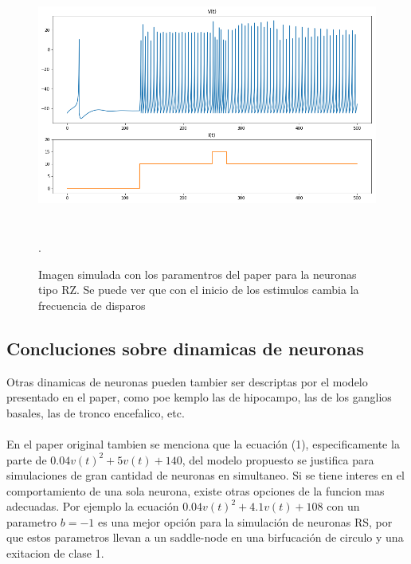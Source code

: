 \documentclass[12pt]{article}
\begin{document}
\begin{figure}[h!]
    \centering
        \includegraphics[height=8cm]{images/RZ.png}
    \caption[fontsize=2pt]{Imagen simulada con los paramentros del paper para la neuronas tipo RZ. Se puede ver que con el inicio de los estimulos cambia la frecuencia de disparos}.
\end{figure}

\subsection{Concluciones sobre dinamicas de neuronas}

Otras dinamicas de neuronas pueden tambier ser descriptas por el modelo presentado en el paper, como poe kemplo las de hipocampo, las de los ganglios basales, las de tronco encefalico, etc. \\ \\
En el paper original tambien se menciona que la ecuación (1), especificamente la parte de $0.04 v(t)^2 + 5 v(t) + 140$, del modelo propuesto se justifica para simulaciones de gran cantidad de neuronas en simultaneo.
Si se tiene interes en el comportamiento de una sola neurona, existe otras opciones de la funcion mas adecuadas. Por ejemplo la ecuación $0.04 v(t)^2 + 4.1 v(t) + 108$ con un parametro $b = -1$ es una mejor opción para la simulación de neuronas RS, por que
estos parametros llevan a un saddle-node en una birfucación de circulo y una exitacion de clase 1. \cite{saddleNode}
\end{document}
